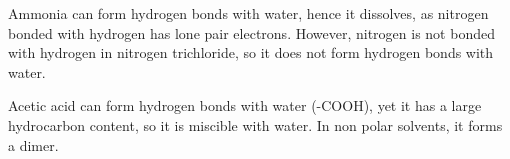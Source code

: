 \documentclass[answers]{exam}
\begin{document}
\begin{questions}

\begin{solution}
	Ammonia can form hydrogen bonds with water, hence it dissolves, as nitrogen bonded with hydrogen has lone pair electrons. However, nitrogen is not bonded with hydrogen in nitrogen trichloride, so it does not form hydrogen bonds with water.
\end{solution}


\begin{solution}
	Acetic acid can form hydrogen bonds with water (-COOH), yet it has a large hydrocarbon content, so it is miscible with water. In non polar solvents, it forms a dimer.
\end{solution}

\end{questions}
\end{document}

